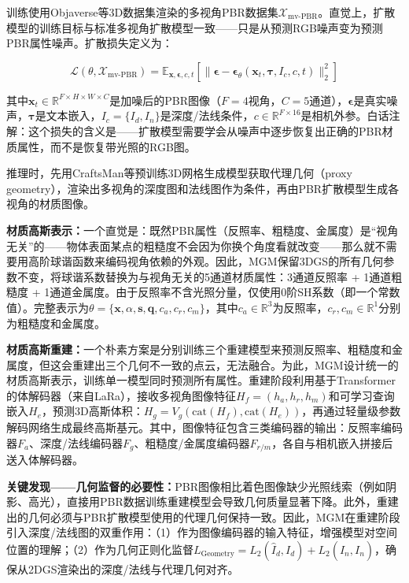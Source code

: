 训练使用Objaverse等3D数据集渲染的多视角PBR数据集$\mathcal{X}_\text{mv-PBR}$。直觉上，扩散模型的训练目标与标准多视角扩散模型一致——只是从预测RGB噪声变为预测PBR属性噪声。扩散损失定义为：

\begin{equation}
\mathcal{L}(\theta, \mathcal{X}_\text{mv-PBR}) = \mathbb{E}_{\mathbf{x}, \boldsymbol{\epsilon}, c, t}\left[\|\boldsymbol{\epsilon} - \boldsymbol{\epsilon}_\theta(\mathbf{x}_t, \boldsymbol{\tau}, I_c, c, t)\|_2^2\right]
\end{equation}

其中$\mathbf{x}_t \in \mathbb{R}^{F \times H \times W \times C}$是加噪后的PBR图像（$F=4$视角，$C=5$通道），$\boldsymbol{\epsilon}$是真实噪声，$\boldsymbol{\tau}$是文本嵌入，$I_c = \{I_d, I_n\}$是深度/法线条件，$c \in \mathbb{R}^{F \times 16}$是相机外参。白话注解：这个损失的含义是——扩散模型需要学会从噪声中逐步恢复出正确的PBR材质属性，而不是恢复带光照的RGB图。

推理时，先用CraftsMan等预训练3D网格生成模型获取代理几何（proxy geometry），渲染出多视角的深度图和法线图作为条件，再由PBR扩散模型生成各视角的材质图像。

\textbf{材质高斯表示：}一个直觉是：既然PBR属性（反照率、粗糙度、金属度）是``视角无关''的——物体表面某点的粗糙度不会因为你换个角度看就改变——那么就不需要用高阶球谐函数来编码视角依赖的外观。因此，MGM保留3DGS的所有几何参数不变，将球谐系数替换为与视角无关的5通道材质属性：3通道反照率 + 1通道粗糙度 + 1通道金属度。由于反照率不含光照分量，仅使用0阶SH系数（即一个常数值）。完整表示为$\theta = \{\mathbf{x}, \alpha, \mathbf{s}, \mathbf{q}, c_a, c_r, c_m\}$，其中$c_a \in \mathbb{R}^3$为反照率，$c_r, c_m \in \mathbb{R}^1$分别为粗糙度和金属度。

\textbf{材质高斯重建：}一个朴素方案是分别训练三个重建模型来预测反照率、粗糙度和金属度，但这会重建出三个几何不一致的点云，无法融合。为此，MGM设计统一的材质高斯表示，训练单一模型同时预测所有属性。重建阶段利用基于Transformer的体解码器（来自LaRa），接收多视角图像特征$H_f = (h_a, h_r, h_m)$和可学习查询嵌入$H_e$，预测3D高斯体积：$H_g = V_g(\text{cat}(H_f), \text{cat}(H_e))$，再通过轻量级参数解码网络生成最终高斯基元。其中，图像特征包含三类编码器的输出：反照率编码器$F_a$、深度/法线编码器$F_g$、粗糙度/金属度编码器$F_{r/m}$，各自与相机嵌入拼接后送入体解码器。

\textbf{关键发现——几何监督的必要性：}PBR图像相比着色图像缺少光照线索（例如阴影、高光），直接用PBR数据训练重建模型会导致几何质量显著下降。此外，重建出的几何必须与PBR扩散模型使用的代理几何保持一致。因此，MGM在重建阶段引入深度/法线图的双重作用：（1）作为图像编码器的输入特征，增强模型对空间位置的理解；（2）作为几何正则化监督$L_\text{Geometry} = L_2(\hat{I}_d, I_d) + L_2(\hat{I}_n, I_n)$，确保从2DGS渲染出的深度/法线与代理几何对齐。

